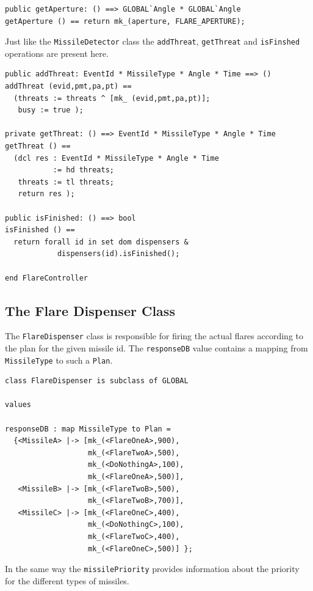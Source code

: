 \documentclass{overturerepchap}
\begin{document}
\begin{lstlisting}
public getAperture: () ==> GLOBAL`Angle * GLOBAL`Angle
getAperture () == return mk_(aperture, FLARE_APERTURE);
\end{lstlisting}

Just like the \texttt{MissileDetector} class the \texttt{addThreat},
\texttt{getThreat} and
\texttt{isFinshed} operations are present here.

\begin{lstlisting}
public addThreat: EventId * MissileType * Angle * Time ==> ()
addThreat (evid,pmt,pa,pt) ==
  (threats := threats ^ [mk_ (evid,pmt,pa,pt)];
   busy := true );

private getThreat: () ==> EventId * MissileType * Angle * Time
getThreat () ==
  (dcl res : EventId * MissileType * Angle * Time 
           := hd threats;
   threats := tl threats;
   return res );

public isFinished: () ==> bool
isFinished () ==
  return forall id in set dom dispensers &
            dispensers(id).isFinished();

end FlareController
\end{lstlisting}

\subsection{The Flare Dispenser Class}

The \texttt{FlareDispenser} class is responsible for firing the actual
flares according to the plan for the given missile id. The \texttt{responseDB}
value contains a mapping from \texttt{MissileType} to such a \texttt{Plan}.
 
\begin{lstlisting}
class FlareDispenser is subclass of GLOBAL

values

responseDB : map MissileType to Plan =
  {<MissileA> |-> [mk_(<FlareOneA>,900),
                   mk_(<FlareTwoA>,500),
                   mk_(<DoNothingA>,100),
                   mk_(<FlareOneA>,500)],
   <MissileB> |-> [mk_(<FlareTwoB>,500),
                   mk_(<FlareTwoB>,700)],
   <MissileC> |-> [mk_(<FlareOneC>,400),
                   mk_(<DoNothingC>,100),
                   mk_(<FlareTwoC>,400),
                   mk_(<FlareOneC>,500)] };
\end{lstlisting}

In the same way the \texttt{missilePriority} provides information about 
the priority for the different types of missiles.
\end{document}
